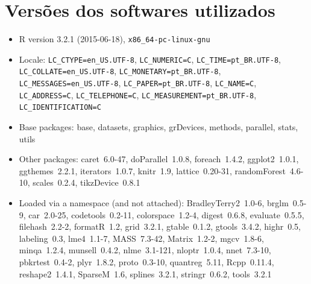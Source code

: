 \documentclass[a4paper,titlepage]{ppgi}\usepackage[]{graphicx}\usepackage[]{color}
\begin{document}




\appendix


\chapter{Versões dos softwares utilizados}

\begin{itemize}\raggedright
  \item R version 3.2.1 (2015-06-18), \verb|x86_64-pc-linux-gnu|
  \item Locale: \verb|LC_CTYPE=en_US.UTF-8|, \verb|LC_NUMERIC=C|, \verb|LC_TIME=pt_BR.UTF-8|, \verb|LC_COLLATE=en_US.UTF-8|, \verb|LC_MONETARY=pt_BR.UTF-8|, \verb|LC_MESSAGES=en_US.UTF-8|, \verb|LC_PAPER=pt_BR.UTF-8|, \verb|LC_NAME=C|, \verb|LC_ADDRESS=C|, \verb|LC_TELEPHONE=C|, \verb|LC_MEASUREMENT=pt_BR.UTF-8|, \verb|LC_IDENTIFICATION=C|
  \item Base packages: base, datasets, graphics, grDevices,
    methods, parallel, stats, utils
  \item Other packages: caret~6.0-47, doParallel~1.0.8,
    foreach~1.4.2, ggplot2~1.0.1, ggthemes~2.2.1, iterators~1.0.7,
    knitr~1.9, lattice~0.20-31, randomForest~4.6-10, scales~0.2.4,
    tikzDevice~0.8.1
  \item Loaded via a namespace (and not attached):
    BradleyTerry2~1.0-6, brglm~0.5-9, car~2.0-25,
    codetools~0.2-11, colorspace~1.2-4, digest~0.6.8,
    evaluate~0.5.5, filehash~2.2-2, formatR~1.2, grid~3.2.1,
    gtable~0.1.2, gtools~3.4.2, highr~0.5, labeling~0.3,
    lme4~1.1-7, MASS~7.3-42, Matrix~1.2-2, mgcv~1.8-6,
    minqa~1.2.4, munsell~0.4.2, nlme~3.1-121, nloptr~1.0.4,
    nnet~7.3-10, pbkrtest~0.4-2, plyr~1.8.2, proto~0.3-10,
    quantreg~5.11, Rcpp~0.11.4, reshape2~1.4.1, SparseM~1.6,
    splines~3.2.1, stringr~0.6.2, tools~3.2.1
\end{itemize}


%
%
%
\end{document}

